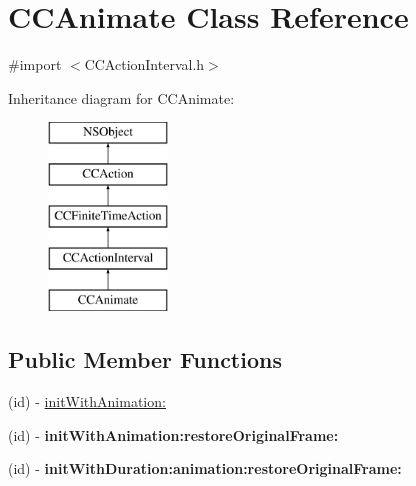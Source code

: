 \hypertarget{interface_c_c_animate}{\section{C\-C\-Animate Class Reference}
\label{interface_c_c_animate}
}


{\ttfamily \#import $<$C\-C\-Action\-Interval.\-h$>$}

Inheritance diagram for C\-C\-Animate\-:\begin{figure}[H]
\begin{center}
\leavevmode
\includegraphics[height=5.000000cm]{interface_c_c_animate}
\end{center}
\end{figure}
\subsection*{Public Member Functions}
\begin{DoxyCompactItemize}
\item 
(id) -\/ \hyperlink{interface_c_c_animate_aac954dac6923a10d4467363842a50e6b}{init\-With\-Animation\-:}
\item 
\hypertarget{interface_c_c_animate_aabe0620adbaca30d9121f0581f7b2adb}{(id) -\/ {\bfseries init\-With\-Animation\-:restore\-Original\-Frame\-:}}\label{interface_c_c_animate_aabe0620adbaca30d9121f0581f7b2adb}

\item 
\hypertarget{interface_c_c_animate_a3dfdda3854665633c552ec36b9214cd7}{(id) -\/ {\bfseries init\-With\-Duration\-:animation\-:restore\-Original\-Frame\-:}}\label{interface_c_c_animate_a3dfdda3854665633c552ec36b9214cd7}

\end{DoxyCompactItemize}
